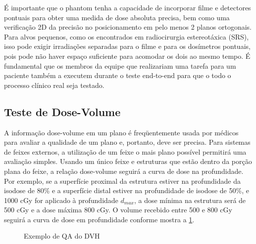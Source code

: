 \documentclass[11pt,a4paper]{article}
\newcounter{exemplo}
\begin{document}
	É importante que o phantom tenha a capacidade de incorporar filme e detectores pontuais para obter uma medida de dose absoluta precisa, bem como uma verificação 2D da precisão no posicionamento em pelo menos 2 planos ortogonais. Para alvos pequenos, como os encontrados em radiocirurgia estereotáxica (SRS), isso pode exigir irradiações separadas para o filme e para os dosímetros pontuais, pois pode não haver espaço suficiente para acomodar os dois ao mesmo tempo. É fundamental que os membros da equipe que realizariam uma tarefa para um paciente também a executem durante o teste end-to-end para que o todo o processo clínico real seja testado.

\subsection*{Teste de Dose-Volume}

	A informação dose-volume em um plano é freqüentemente usada por médicos para avaliar a qualidade de um plano e, portanto, deve ser precisa. Para sistemas de feixes externos, a utilização de um feixe o mais plano possível permitirá uma avaliação simples. Usando um único feixe e estruturas que estão dentro da porção plana do feixe, a relação dose-volume seguirá a curva de dose na profundidade. Por exemplo, se a superfície proximal da estrutura estiver na profundidade da isodose de 80\% e a superfície distal estiver na profundidade de isodose de 50\%, e 1000 cGy for aplicado à profundidade $d_{max}$, a dose mínima na estrutura será de 500 cGy e a dose máxima 800 cGy. O volume recebido entre 500 e 800 cGy seguirá a curva de dose em profundidade conforme mostra a \ref{fig:exemploQaDvh}.

	\begin{figure}[h]
		\centering
		\caption{Exemplo de QA do DVH}
		\label{fig:exemploQaDvh}
	\end{figure}
\end{document}
